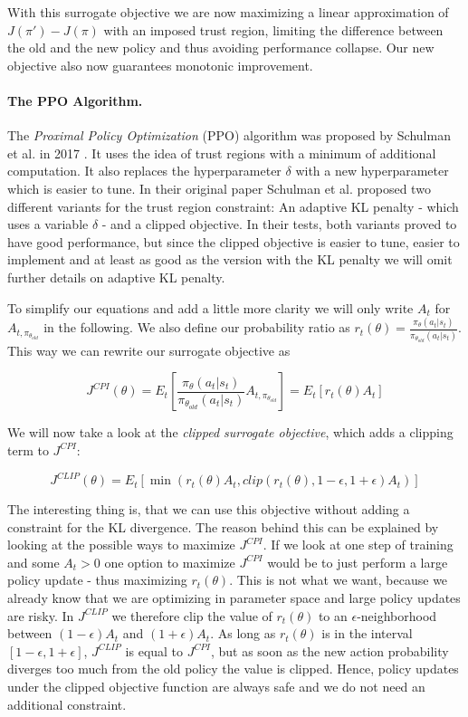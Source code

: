 With this surrogate objective we are now maximizing a linear approximation of $J(\pi') - J(\pi)$ with an imposed trust region, limiting the difference between the old and the new policy and thus avoiding performance collapse. Our new objective also now guarantees monotonic improvement.

\paragraph{The PPO Algorithm.}
The \textit{Proximal Policy Optimization} (PPO) algorithm was proposed by Schulman et al. in 2017 \cite{schulman2017proximal}. It uses the idea of trust regions with a minimum of additional computation. It also replaces the hyperparameter $\delta$ with a new hyperparameter which is easier to tune. In their original paper Schulman et al. proposed two different variants for the trust region constraint: An adaptive KL penalty - which uses a variable $\delta$ - and a clipped objective. In their tests, both variants proved to have good performance, but since the clipped objective is easier to tune, easier to implement and at least as good as the version with the KL penalty we will omit further details on adaptive KL penalty. 

To simplify our equations and add a little more clarity we will only write $A_t$ for $A_{t, \pi_{\theta_{old}}}$ in the following. We also define our probability ratio as $r_t(\theta) = \frac{\pi_\theta(a_t|s_t)}{\pi_{\theta_{old}}(a_t|s_t)}$. This way we can rewrite our surrogate objective as

  \[J^{CPI}(\theta) = E_t\left[\frac{\pi_\theta(a_t|s_t)}{\pi_{\theta_{old}}(a_t|s_t)}A_{t, \pi_{\theta_{old}}}\right] = E_t[r_t(\theta)A_t]\]

We will now take a look at the \textit{clipped surrogate objective}, which adds a clipping term to $J^{CPI}$:

\[J^{CLIP}(\theta) = E_t[\min(r_t(\theta)A_t, clip(r_t(\theta), 1-\epsilon, 1+\epsilon)A_t)]\]

The interesting thing is, that we can use this objective without adding a constraint for the KL divergence. The reason behind this can be explained by looking at the possible ways to maximize $J^{CPI}$. If we look at one step of training and some $A_t > 0$ one option to maximize $J^{CPI}$ would be to just perform a large policy update - thus maximizing $r_t(\theta)$. This is not what we want, because we already know that we are optimizing in parameter space and large policy updates are risky. In $J^{CLIP}$ we therefore clip the value of $r_t(\theta)$ to an $\epsilon$-neighborhood between $(1-\epsilon)A_t$ and $(1+\epsilon)A_t$. As long as $r_t(\theta)$ is in the interval $[1-\epsilon, 1+\epsilon]$, $J^{CLIP}$ is equal to $J^{CPI}$, but as soon as the new action probability diverges too much from the old policy the value is clipped. Hence, policy updates under the clipped objective function are always safe and we do not need an additional constraint.

